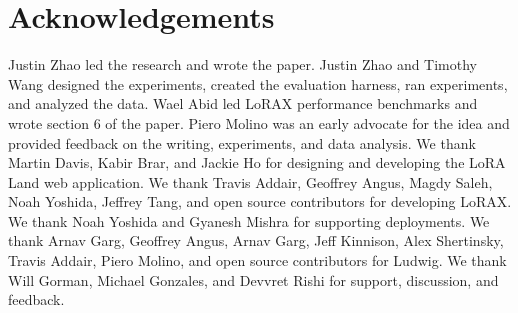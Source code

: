 \section{Acknowledgements}
\label{sec:contrib}

Justin Zhao led the research and wrote the paper. Justin Zhao and Timothy Wang designed the experiments, created the evaluation harness, ran experiments, and analyzed the data. Wael Abid led LoRAX performance benchmarks and wrote section 6 of the paper. Piero Molino was an early advocate for the idea and provided feedback on the writing, experiments, and data analysis. We thank Martin Davis, Kabir Brar, and Jackie Ho for designing and developing the LoRA Land web application. We thank Travis Addair, Geoffrey Angus, Magdy Saleh, Noah Yoshida, Jeffrey Tang, and open source contributors for developing LoRAX. We thank Noah Yoshida and Gyanesh Mishra for supporting deployments. We thank Arnav Garg, Geoffrey Angus, Arnav Garg, Jeff Kinnison, Alex Shertinsky, Travis Addair, Piero Molino, and open source contributors for Ludwig. We thank Will Gorman, Michael Gonzales, and Devvret Rishi for support, discussion, and feedback.
